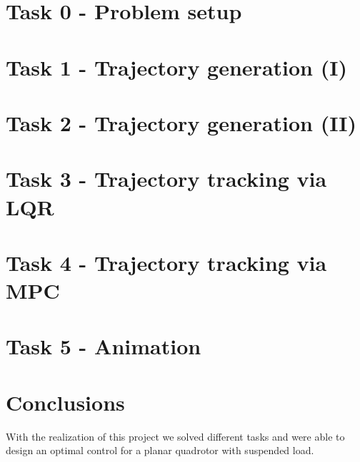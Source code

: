 \documentclass[a4paper,11pt,oneside]{book}
\begin{document}

\chapter{Task 0 - Problem setup}


\chapter{Task 1 - Trajectory generation (I)}


\chapter{Task 2 - Trajectory generation (II)}


\chapter{Task 3 - Trajectory tracking via LQR}


\chapter{Task 4 - Trajectory tracking via MPC}


\chapter{Task 5 - Animation}



\chapter*{Conclusions}

With the realization of this project we solved different tasks and were able to design an optimal control for a planar quadrotor with suspended load.
\end{document}
